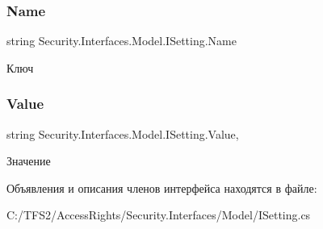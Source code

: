 \subsubsection{\texorpdfstring{Name}{Name}}
{\footnotesize\ttfamily string Security.\+Interfaces.\+Model.\+I\+Setting.\+Name\hspace{0.3cm}{\ttfamily [get]}}



Ключ 

\mbox{\label{interface_security_1_1_interfaces_1_1_model_1_1_i_setting_ac1b29dd176e0389099fd1ce78e35f6b8}} 
\subsubsection{\texorpdfstring{Value}{Value}}
{\footnotesize\ttfamily string Security.\+Interfaces.\+Model.\+I\+Setting.\+Value\hspace{0.3cm}{\ttfamily [get]}, {\ttfamily [set]}}



Значение 



Объявления и описания членов интерфейса находятся в файле\+:\begin{DoxyCompactItemize}
\item 
C\+:/\+T\+F\+S2/\+Access\+Rights/\+Security.\+Interfaces/\+Model/I\+Setting.\+cs\end{DoxyCompactItemize}
